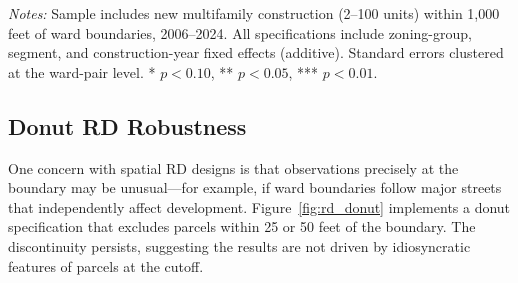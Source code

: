 \begin{table}[H]
    \caption{Effect of Aldermanic Strictness on Development Density (1,000 ft Bandwidth)}
    \label{tab:fe_estimates_1000}

    

    \footnotesize
    \textit{Notes:} Sample includes new multifamily construction (2--100 units) within 1,000 feet of ward boundaries, 2006--2024. All specifications include zoning-group, segment, and construction-year fixed effects (additive). Standard errors clustered at the ward-pair level. * $p<0.10$, ** $p<0.05$, *** $p<0.01$.
\end{table}

\subsection{Donut RD Robustness}

One concern with spatial RD designs is that observations precisely at the boundary may be unusual---for example, if ward boundaries follow major streets that independently affect development. Figure~\ref{fig:rd_donut} implements a donut specification \citep{barreca_saving_2011, barreca_heapinginduced_2016} that excludes parcels within 25 or 50 feet of the boundary. The discontinuity persists, suggesting the results are not driven by idiosyncratic features of parcels at the cutoff.

